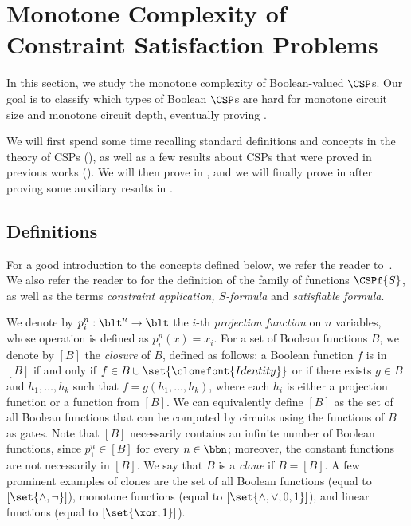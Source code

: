 \documentclass[11pt]{article}
\begin{document}
\section{Monotone Complexity of Constraint Satisfaction Problems}
\label{sec:CSPs}

In this section, we study the monotone complexity of Boolean-valued $\CSP$s.
Our goal is to classify which types of Boolean $\CSP$s are hard for
monotone circuit size and monotone circuit depth,
eventually proving
.

We will first spend some time recalling standard definitions and concepts
in the theory of CSPs (),
as well as a few results about CSPs that were
proved in previous works
\cite{DBLP:conf/stoc/Schaefer78,DBLP:journals/tcs/Jeavons98,
playing_one,playing_two,DBLP:journals/jcss/AllenderBISV09}
().
We will then prove 
in ,
and
we will finally prove 
in 
after 
proving some auxiliary results
in .

\subsection{Definitions}
\label{sec:csp-def}

For a good introduction to the concepts defined below, we refer the reader
to~\cite{playing_one, playing_two}.
We also refer the reader to 
for 
the definition of the family of functions
$\CSPf{S}$, as well as the terms
\emph{constraint application, $S$-formula} and \emph{satisfiable formula}.



We denote by $p_i^n : \blt^n \to \blt$ the
$i$-th \emph{projection function} on $n$ variables,
whose operation is defined as
$p_i^n(x) = x_i$.
For a set of Boolean functions $B$,
we
denote by $[B]$ the \emph{closure} of $B$,
defined as follows:
a Boolean function $f$ is in $[B]$
if and only if
$f \in B \cup \set{\clonefont{Identity}}$
or if there exists $g \in B$
and $h_1,\dots,h_k$
such that
$f = g(h_1,\dots,h_k)$,
where each $h_i$ is either a 
projection function or a function from $[B]$.
We can equivalently define $[B]$ as
the set of all Boolean functions
that can be computed by circuits using 
the functions of $B$ as gates.
Note that $[B]$ necessarily contains an infinite number of Boolean
functions, 
since $p_1^n \in [B]$ for every $n \in \bbn$;
moreover, the constant functions
are not necessarily in $[B]$.
We say that $B$ is a \emph{clone} if $B = [B]$.
A few prominent examples of clones are the set of all Boolean functions
(equal to $[\set{\land,\neg}]$),
monotone functions
(equal to $[\set{\land,\lor,0,1}]$), 
and linear functions
(equal to $[\set{\xor,1}]$).
\end{document}
